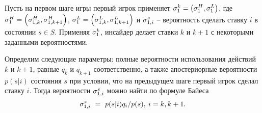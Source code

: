 {Пусть на первом шаге игры первый игрок применяет %
$\fGeneral{k} = \left(\fGeneral{H}, \fGeneral{L}\right)$, где %
$\fGeneral{H} = \left(\fGeneral[1,k]{H}, \fGeneral[1,k+1]{H}\right)$,
$\fGeneral{L} = \left(\fGeneral[1,k]{L}, \fGeneral[1,k+1]{L}\right)$ и
$\fGeneral[1,i]{s}$ -- вероятность сделать ставку $i$ в состоянии $s \in S$.
Применяя $\fGeneral{k}$, инсайдер делает ставки $k$ и $k+1$ с некоторыми
заданными вероятностями.

Определим следующие параметры: полные вероятности использования действий $k$ и
$k+1$, равные $q_k$ и $q_{k+1}$ соответственно, а также апостериорные
вероятности $p(s|i)$ состояния $s$ при условии, что на предыдущем шаге первый
игрок сделал ставку $i$. Тогда вероятности $\fGeneral[1,i]{s}$ можно найти по
формуле Байеса
\[
  \fGeneral[1,i]{s}~=~p(s|i)q_i/p(s), \: i = k, k + 1.
\]

}
